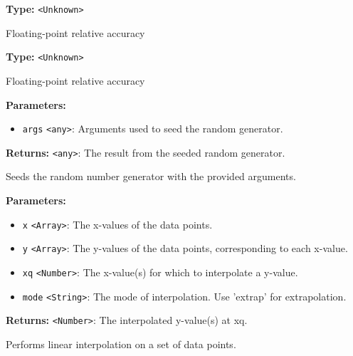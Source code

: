 \documentclass[12pt,a4paper]{article}
\begin{document}
\noindent \textbf{Type:} \texttt{<Unknown>}

\noindent Floating-point relative accuracy

\vspace{5mm}
\noindent {}\vspace{4mm}


\noindent \textbf{Type:} \texttt{<Unknown>}

\noindent Floating-point relative accuracy

\vspace{5mm}
\noindent {}


\noindent \textbf{Parameters:}
\begin{itemize}
  \item \texttt{args} \texttt{<any>}: Arguments used to seed the random generator.
\end{itemize}

\noindent \textbf{Returns:} \texttt{<any>}: The result from the seeded random generator.

\noindent Seeds the random number generator with the provided arguments.

\vspace{5mm}
\noindent {}


\noindent \textbf{Parameters:}
\begin{itemize}
  \item \texttt{x} \texttt{<Array>}: The x-values of the data points.
  \item \texttt{y} \texttt{<Array>}: The y-values of the data points, corresponding to each x-value.
  \item \texttt{xq} \texttt{<Number>}: The x-value(s) for which to interpolate a y-value.
  \item \texttt{mode} \texttt{<String>}: The mode of interpolation. Use 'extrap' for extrapolation.
\end{itemize}

\noindent \textbf{Returns:} \texttt{<Number>}: The interpolated y-value(s) at xq.

\noindent Performs linear interpolation on a set of data points.
\end{document}
